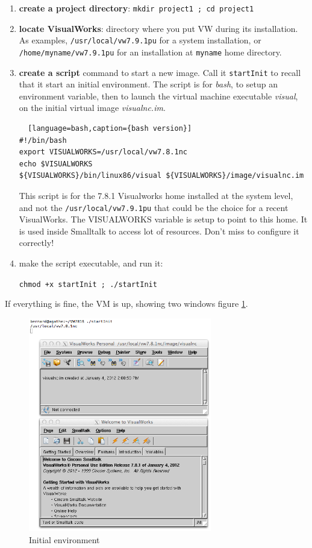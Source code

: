 \documentclass[times]{book}
\begin{document}
\begin{enumerate}
\item {\bf create a project directory}: {\tt mkdir project1 ; cd project1}
\item {\bf locate VisualWorks}: directory where  you put VW during its installation.
As examples, {\tt /usr/local/vw7.9.1pu} for a system installation, or {\tt /home/myname/vw7.9.1pu}
for an installation at {\tt myname} home directory.
\item {\bf create a script} command to start a new image. Call it {\tt startInit} to recall
that it start an initial environment.  The script is for {\sl bash}, to setup an environment variable,
then to launch the virtual machine executable {\sl visual}, on the initial virtual image {\sl visualnc.im}.

\begin{lstlisting}  [language=bash,caption={bash version}]
#!/bin/bash
export VISUALWORKS=/usr/local/vw7.8.1nc
echo $VISUALWORKS
${VISUALWORKS}/bin/linux86/visual ${VISUALWORKS}/image/visualnc.im
\end{lstlisting}


This script is for the 7.8.1 Visualworks home  installed at the system level,
and not the {\tt /usr/local/vw7.9.1pu} that could be the choice for a recent VisualWorks.
The VISUALWORKS variable is setup to point to this home. It is used inside
Smalltalk to access lot of resources. Don't miss to configure it correctly!

\item make the script executable, and run it:

{\tt chmod +x startInit ; ./startInit}
\end{enumerate}

If everything is fine, the VM is up, showing two windows figure \ref{fig:startInit-initialEnv}.


\begin{figure}[hbtp]
\begin{center} 
\includegraphics[width=8cm]{startInit-initialEnv.png}
\caption{Initial environment}
\label{fig:startInit-initialEnv}
\end{center}
\end{figure}
 
\end{document}
